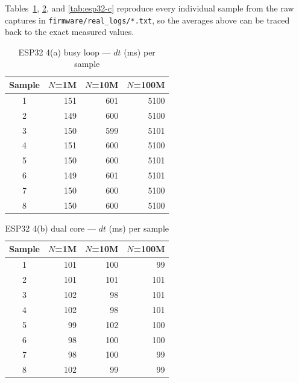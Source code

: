 Tables~\ref{tab:esp32-a}, \ref{tab:esp32-b}, and \ref{tab:esp32-c} reproduce every individual sample from the raw captures in \texttt{firmware/real\_logs/*.txt}, so the averages above can be traced back to the exact measured values.

\begin{table}[!t]
\centering
\caption{ESP32 4(a) busy loop — $dt$ (ms) per sample}
\label{tab:esp32-a}
\small
\begin{tabular}{@{}c r r r@{}}
\toprule
Sample & $N$=1M & $N$=10M & $N$=100M \\
\midrule
1 & 151 & 601 & 5100 \\
2 & 149 & 600 & 5100 \\
3 & 150 & 599 & 5101 \\
4 & 151 & 600 & 5100 \\
5 & 150 & 600 & 5101 \\
6 & 149 & 601 & 5101 \\
7 & 150 & 600 & 5100 \\
8 & 150 & 600 & 5100 \\
\bottomrule
\end{tabular}
\end{table}

\begin{table}[!t]
\centering
\caption{ESP32 4(b) dual core — $dt$ (ms) per sample}
\label{tab:esp32-b}
\small
\begin{tabular}{@{}c r r r@{}}
\toprule
Sample & $N$=1M & $N$=10M & $N$=100M \\
\midrule
1 & 101 & 100 & 99 \\
2 & 101 & 101 & 101 \\
3 & 102 & 98 & 101 \\
4 & 102 & 98 & 101 \\
5 & 99 & 102 & 100 \\
6 & 98 & 100 & 100 \\
7 & 98 & 100 & 99 \\
8 & 102 & 99 & 99 \\
\bottomrule
\end{tabular}
\end{table}

